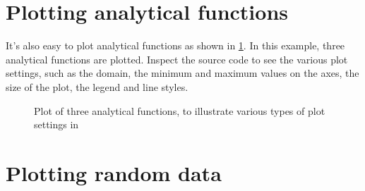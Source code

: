 \section{Plotting analytical functions}
It's also easy to plot analytical functions as shown in \cref{fig:analyticalfunctions}. In this example, three analytical functions are plotted. Inspect the source code to see the various plot settings, such as the domain, the minimum and maximum values on the axes, the size of the plot, the legend and line styles.

\begin{figure}[htb]\centering
    \def\funA{6*x*x-20*x+10} %
	\caption{Plot of three analytical functions, to illustrate various types of plot settings in \TikZ}\label{fig:analyticalfunctions}
\end{figure}

\section{Plotting random data}

